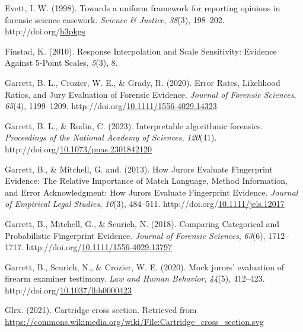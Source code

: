 \documentclass[print]{nuthesis}
\newlength{\cslhangindent}
\newenvironment{CSLReferences}[2]%
{\setlength{\parindent}{0pt}%
\everypar{\setlength{\hangindent}{\cslhangindent}}\ignorespaces}%
{\par}
\begin{document}
\begin{CSLReferences}{1}{0}
\leavevmode{}%
Evett, I. W. (1998). Towards a uniform framework for reporting opinions in forensic science casework. \emph{Science \& Justice}, \emph{38}(3), 198--202. http://doi.org/\href{https://doi.org/b3pkgs}{b3pkgs}

\leavevmode{}%
Finstad, K. (2010). Response {Interpolation} and {Scale} {Sensitivity}: {Evidence} {Against} 5-{Point} {Scales}, \emph{5}(3), 8.

\leavevmode{}%
Garrett, B. L., Crozier, W. E., \& Grady, R. (2020). Error {Rates}, {Likelihood} {Ratios}, and {Jury} {Evaluation} of {Forensic} {Evidence}. \emph{Journal of Forensic Sciences}, \emph{65}(4), 1199--1209. http://doi.org/\href{https://doi.org/10.1111/1556-4029.14323}{10.1111/1556-4029.14323}

\leavevmode{}%
Garrett, B. L., \& Rudin, C. (2023). Interpretable algorithmic forensics. \emph{Proceedings of the National Academy of Sciences}, \emph{120}(41). http://doi.org/\href{https://doi.org/10.1073/pnas.2301842120}{10.1073/pnas.2301842120}

\leavevmode{}%
Garrett, B., \& Mitchell, G. and. (2013). How {Jurors} {Evaluate} {Fingerprint} {Evidence}: {The} {Relative} {Importance} of {Match} {Language}, {Method} {Information}, and {Error} {Acknowledgment}: {How} {Jurors} {Evaluate} {Fingerprint} {Evidence}. \emph{Journal of Empirical Legal Studies}, \emph{10}(3), 484--511. http://doi.org/\href{https://doi.org/10.1111/jels.12017}{10.1111/jels.12017}

\leavevmode{}%
Garrett, B., Mitchell, G., \& Scurich, N. (2018). Comparing {Categorical} and {Probabilistic} {Fingerprint} {Evidence}. \emph{Journal of Forensic Sciences}, \emph{63}(6), 1712--1717. http://doi.org/\href{https://doi.org/10.1111/1556-4029.13797}{10.1111/1556-4029.13797}

\leavevmode{}%
Garrett, B., Scurich, N., \& Crozier, W. E. (2020). Mock jurors' evaluation of firearm examiner testimony. \emph{Law and Human Behavior}, \emph{44}(5), 412--423. http://doi.org/\href{https://doi.org/10.1037/lhb0000423}{10.1037/lhb0000423}

\leavevmode{}%
Glrx. (2021). Cartridge cross section. Retrieved from \url{https://commons.wikimedia.org/wiki/File:Cartridge_cross_section.svg}


\end{CSLReferences}
\end{document}
